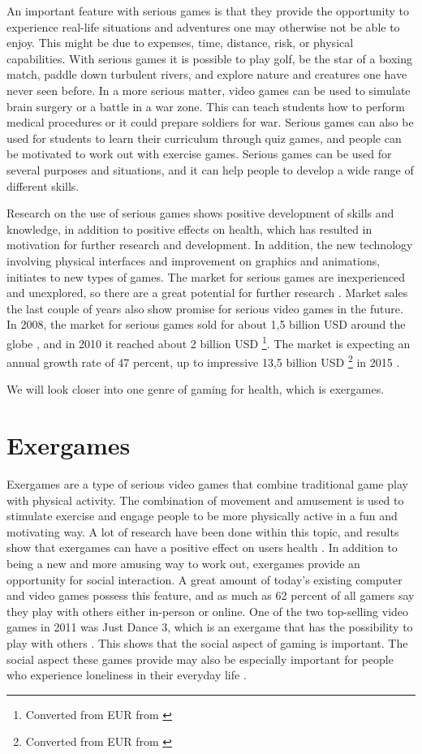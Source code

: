 An important feature with serious games is that they provide the opportunity to experience real-life situations and adventures one may otherwise not be able to enjoy. This might be due to expenses, time, distance, risk, or physical capabilities. With serious games it is possible to play golf, be the star of a boxing match, paddle down turbulent rivers, and explore nature and creatures one have never seen before. In a more serious matter, video games can be used to simulate brain surgery or a battle in a war zone. This can teach students how to perform medical procedures or it could prepare soldiers for war. Serious games can also be used for students to learn their curriculum through quiz games, and people can be motivated to work out with exercise games. Serious games can be used for several purposes and situations, and it can help people to develop a wide range of different skills. 

Research on the use of serious games shows positive development of skills and knowledge, in addition to positive effects on health, which has resulted in motivation for further research and development. In addition, the new technology involving physical interfaces and improvement on graphics and animations, initiates to new types of games. The market for serious games are inexperienced and unexplored, so there are a great potential for further research \cite{alfingewang}. Market sales the last couple of years also show promise for serious video games in the future. In 2008, the market for serious games sold for about 1,5 billion USD around the globe \cite{alfingewang}, and in 2010 it reached about 2 billion USD \footnote{Converted from EUR from \cite{idate}}. The market is expecting an annual growth rate of 47 percent, up to impressive 13,5 billion USD \footnote{Converted from EUR from \cite{idate}} in 2015 \cite{idate}. 

We will look closer into one genre of gaming for health, which is exergames.  

\section{Exergames}
\label{sec:exergames}
Exergames are a type of serious video games that combine traditional game play with physical activity. The combination of movement and amusement is used to stimulate exercise and engage people to be more physically active in a fun and motivating way. A lot of research have been done within this topic, and results show that exergames can have a positive effect on users health \cite{excell} \cite{garcia2012exergames} \cite{taylor2011activity}. In addition to being a new and more amusing way to work out, exergames provide an opportunity for social interaction. A great amount of today's existing computer and video games possess this feature, and as much as 62 percent of all gamers say they play with others either in-person or online. One of the two top-selling video games in 2011 was Just Dance 3, which is an exergame that has the possibility to play with others \cite{statistics2012}. This shows that the social aspect of gaming is important. The social aspect these games provide may also be especially important for people who experience loneliness in their everyday life \cite{exergamesforelderly}.

